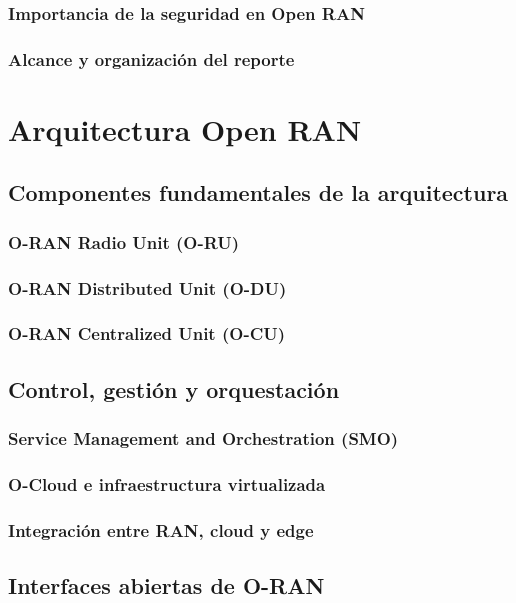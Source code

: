 \documentclass[11pt,a4paper]{article}
\makeatletter
\let\ORIGsection\section
\def\section{\@nobreakfalse\ORIGsection}
\let\ORIGsubsection\subsection
\def\subsection{\@nobreakfalse\ORIGsubsection}
\let\ORIGsubsubsection\subsubsection
\def\subsubsection{\@nobreakfalse\ORIGsubsubsection}
\makeatother
\begin{document}
\subsubsection{Importancia de la seguridad en Open RAN}
\subsubsection{Alcance y organización del reporte}


\section{Arquitectura Open RAN}

\subsection{Componentes fundamentales de la arquitectura}

\subsubsection{O-RAN Radio Unit (O-RU)}
\subsubsection{O-RAN Distributed Unit (O-DU)}
\subsubsection{O-RAN Centralized Unit (O-CU)}

\subsection{Control, gestión y orquestación}

\subsubsection{Service Management and Orchestration (SMO)}
\subsubsection{O-Cloud e infraestructura virtualizada}
\subsubsection{Integración entre RAN, cloud y edge}

\subsection{Interfaces abiertas de O-RAN}
\end{document}
